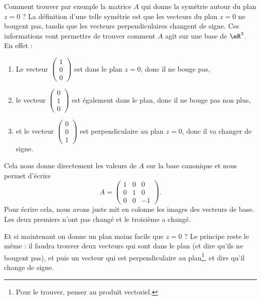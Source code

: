 Comment trouver par exemple la matrice $A$ qui donne la symétrie autour du plan $z=0$ ? La définition d'une telle symétrie est que les vecteurs du plan $z=0$ ne bougent pas, tandis que les vecteurs perpendiculaires changent de signe. Ces informations vont permettre de trouver comment $A$ agit sur une base de $\eR^3$. En effet :
\begin{enumerate}

	\item
		Le vecteur $\begin{pmatrix}
			1	\\ 
			0	\\ 
			0	
		\end{pmatrix}$ est dans le plan $z=0$, donc il ne bouge pas,

	\item
		le vecteur $\begin{pmatrix}
			0	\\ 
			1	\\ 
			0	
		\end{pmatrix}$ est également dans le plan, donc il ne bouge pas non plus,

	\item
		et le vecteur $\begin{pmatrix}
			0	\\ 
			0	\\ 
			1	
		\end{pmatrix}$ est perpendiculaire au plan $z=0$, donc il va changer de signe.

\end{enumerate}
Cela nous donne directement les valeurs de $A$ sur la base canonique et nous permet d'écrire 
\begin{equation}
	A=\begin{pmatrix}
		1	&	0	&	0	\\
		0	&	1	&	0	\\
		0	&	0	&	-1
	\end{pmatrix}.
\end{equation}
Pour écrire cela, nous avons juste mit en colonne les images des vecteurs de base. Les deux premiers n'ont pas changé et le troisième a changé.

Et si maintenant on donne un plan moins facile que $z=0$ ? Le principe reste le même : il faudra trouver deux vecteurs qui sont dans le plan (et dire qu'ils ne bougent pas), et puis un vecteur qui est perpendiculaire au plan\footnote{Pour le trouver, penser au produit vectoriel.}, et dire qu'il change de signe.

